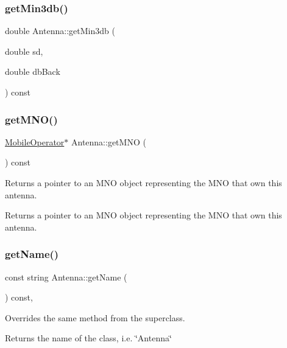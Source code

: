 \subsubsection{\texorpdfstring{getMin3db()}{getMin3db()}}
{\footnotesize\ttfamily double Antenna\+::get\+Min3db (\begin{DoxyParamCaption}\item[{double}]{sd,  }\item[{double}]{db\+Back }\end{DoxyParamCaption}) const\hspace{0.3cm}{\ttfamily [private]}}

\mbox{\label{class_antenna_abfbb4a654f73fe0c3a30f50777f79349}} 
\subsubsection{\texorpdfstring{getMNO()}{getMNO()}}
{\footnotesize\ttfamily \mbox{\hyperlink{class_mobile_operator}{Mobile\+Operator}}$\ast$ Antenna\+::get\+M\+NO (\begin{DoxyParamCaption}{ }\end{DoxyParamCaption}) const}

Returns a pointer to an M\+NO object representing the M\+NO that own this antenna. \begin{DoxyReturn}{Returns}
a pointer to an M\+NO object representing the M\+NO that own this antenna. 
\end{DoxyReturn}
\mbox{\label{class_antenna_a4ad9da1ca9d79f20b331c22b94c57a02}} 
\subsubsection{\texorpdfstring{getName()}{getName()}}
{\footnotesize\ttfamily const string Antenna\+::get\+Name (\begin{DoxyParamCaption}{ }\end{DoxyParamCaption}) const\hspace{0.3cm}{\ttfamily [override]}, {\ttfamily [virtual]}}

Overrides the same method from the superclass. \begin{DoxyReturn}{Returns}
the name of the class, i.\+e. \char`\"{}\+Antenna\char`\"{} 
\end{DoxyReturn}


